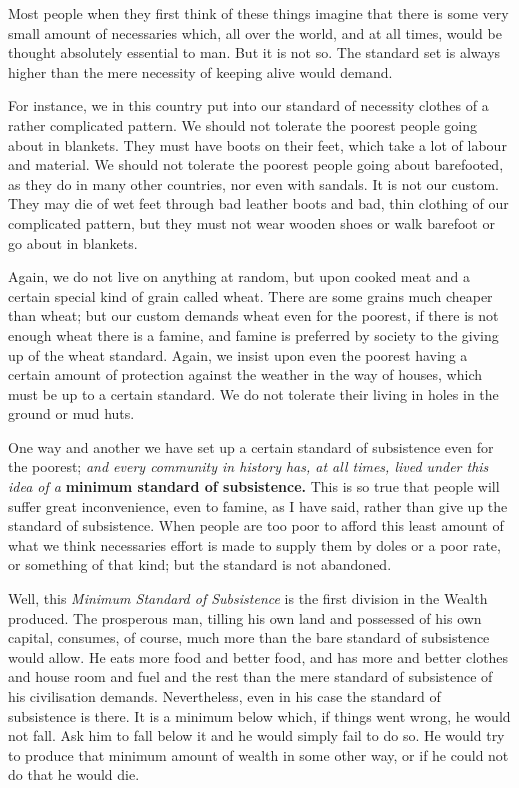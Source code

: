 \documentclass{book}
\begin{document}
Most people when they first think of these things imagine that there is some very small amount of necessaries which, all over the world, and at all times, would be thought absolutely essential to man. But it is not so. The standard set is always higher than the mere necessity of keeping alive would demand.

For instance, we in this country put into our standard of necessity clothes of a rather complicated pattern. We should not tolerate the poorest people going about in blankets. They must have boots on their feet, which take a lot of labour and material. We should not tolerate the poorest people going about barefooted, as they do in many other countries, nor even with sandals. It is not our custom. They may die of wet feet through bad leather boots and bad, thin clothing of our complicated pattern, but they must not wear wooden shoes or walk barefoot or go about in blankets.

Again, we do not live on anything at random, but upon cooked meat and a certain special kind of grain called wheat. There are some grains much cheaper than wheat; but our custom demands wheat even for the poorest, if there is not enough wheat there is a famine, and famine is preferred by society to the giving up of the wheat standard. Again, we insist upon even the poorest having a certain amount of protection against the weather in the way of houses, which must be up to a certain standard. We do not tolerate their living in holes in the ground or mud huts.

One way and another we have set up a certain standard of subsistence even for the poorest; \emph{and every community in history has, at all times, lived under this idea of a} \textbf{minimum standard of subsistence.} This is so true that people will suffer great inconvenience, even to famine, as I have said, rather than give up the standard of subsistence. When people are too poor to afford this least amount of what we think necessaries effort is made to supply them by doles or a poor rate, or something of that kind; but the standard is not abandoned.

Well, this \emph{Minimum Standard of Subsistence} is the first division in the Wealth produced. The prosperous man, tilling his own land and possessed of his own capital, consumes, of course, much more than the bare standard of subsistence would allow. He eats more food and better food, and has more and better clothes and house room and fuel and the rest than the mere standard of subsistence of his civilisation demands. Nevertheless, even in his case the standard of subsistence is there. It is a minimum below which, if things went wrong, he would not fall. Ask him to fall below it and he would simply fail to do so. He would try to produce that minimum amount of wealth in some other way, or if he could not do that he would die.
\end{document}
